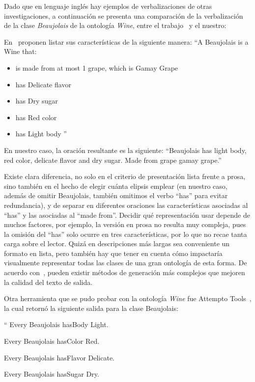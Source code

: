 Dado que en lenguaje inglés hay ejemplos de verbalizaciones de otras investigaciones, a continuación se presenta una comparación de la verbalización de la clase \emph{Beaujolais} de la ontología \emph{Wine}, entre el trabajo~\cite{hewlett2005effective} y el nuestro:

En~\cite{hewlett2005effective} proponen listar sus características de la siguiente manera: 
``A Beaujolais is a Wine that:
\begin{itemize}
    \item is made from at most 1 grape, which is Gamay Grape
    \item has Delicate flavor
    \item has Dry sugar 
    \item has Red color
    \item has Light body ''
\end{itemize}

En nuestro caso, la oración resultante es la siguiente:
``Beaujolais has light body, red color, delicate flavor and dry sugar. Made from grape gamay grape.''

Existe clara diferencia, no solo en el criterio de presentación lista frente a prosa, sino también en el hecho de elegir cuánta elipsis emplear (en nuestro caso, además de omitir Beaujolais, también omitimos el verbo ``has'' para evitar redundancia), y de separar en diferentes oraciones las características asociadas al ``has'' y las asociadas al ``made from''. Decidir qué representación usar depende de muchos factores, por ejemplo, la versión en prosa no resulta muy compleja, pues la omisión del ``has'' solo ocurre en tres características, por lo que no recae tanta carga sobre el lector. Quizá en descripciones más largas sea conveniente un formato en lista, pero también hay que tener en cuenta cómo impactaría visualmente representar todas las clases de una gran ontología de esta forma. De acuerdo con~\cite{hewlett2005effective}, pueden existir métodos de generación más complejos que mejoren la calidad del texto de salida.

Otra herramienta que se pudo probar con la ontología \emph{Wine} fue Attempto Tools~\cite{attempto}, la cual retornó la siguiente salida para la clase Beaujolais:

``
Every Beaujolais hasBody Light.

Every Beaujolais hasColor Red.

Every Beaujolais hasFlavor Delicate.

Every Beaujolais hasSugar Dry.

